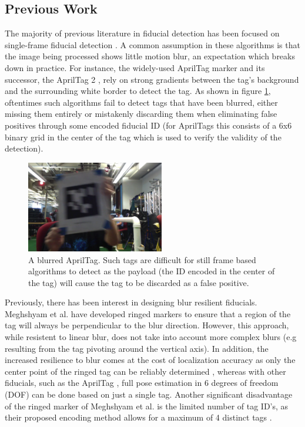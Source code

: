 \documentclass[letterpaper, 10 pt, conference]{ieeeconf}
\begin{document}
\subsection{Previous Work}

 The majority of previous literature in fiducial detection has been focused on single-frame fiducial detection \citep{RUNETag, BlurResilient, AprilTag}. A common assumption in these algorithms is that the image being processed shows little motion blur, an expectation which breaks down in practice. For instance, the widely-used AprilTag marker \citep{AprilTag} and its successor, the AprilTag 2 \citep{AprilTag_2}, rely on strong gradients between the tag's background and the surrounding white border to detect the tag. As shown in figure \ref{fig:blurred_tag}, oftentimes such algorithms fail to detect tags that have been blurred, either missing them entirely or mistakenly discarding them when eliminating false positives through some encoded fiducial ID (for AprilTags this consists of a 6x6 binary grid in the center of the tag which is used to verify the validity of the detection).

\begin{figure}[b]
	\centering
	\includegraphics[width=6cm, height=4cm]{blurred_tag}
	\caption{A blurred AprilTag. Such tags are difficult for still frame based algorithms to detect as the payload (the ID encoded in the center of the tag) will cause the tag to be discarded as a false positive.}
	\label{fig:blurred_tag}
\end{figure}

Previously, there has been interest in designing blur resilient fiducials. Meghshyam et al. \citep{BlurResilient} have developed ringed markers to ensure that a region of the tag will always be perpendicular to the blur direction. However, this approach, while resistent to linear blur, does not take into account more complex blurs (e.g resulting from the tag pivoting around the vertical axis). In addition, the increased resilience to blur comes at the cost of localization accuracy as only the center point of the ringed tag can be reliably determined \citep{BlurResilient}, whereas with other fiducials, such as the AprilTag \citep{AprilTag}, full pose estimation in 6 degrees of freedom (DOF) can be done based on just a single tag. Another significant disadvantage of the ringed marker of Meghshyam et al. is the limited number of tag ID's, as their proposed encoding method allows for a maximum of 4 distinct tags \citep{BlurResilient}.
\end{document}
